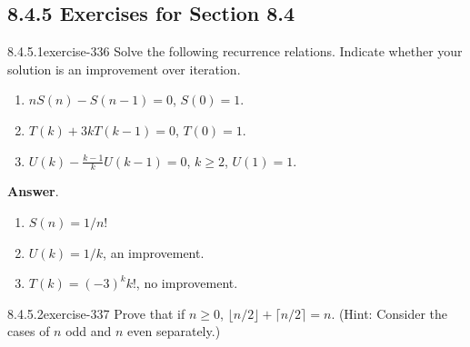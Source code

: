 \documentclass[twoside,10pt,]{book}
\numberwithin{equation}{section}
\begin{document}
\subsection*{8.4.5 Exercises for Section 8.4}
\begin{divisionsolution}{8.4.5.1}{}{exercise-336}%
\hypertarget{p-2800}{}%
Solve the following recurrence relations. Indicate whether your solution is an improvement over iteration.%
\par
\hypertarget{p-2801}{}%
\leavevmode%
\begin{enumerate}[label=(\alph*)]
\item\hypertarget{li-1368}{}\hypertarget{p-2802}{}%
\(n S(n) - S(n - 1) = 0\), \(S(0) = 1\).%
\item\hypertarget{li-1369}{}\hypertarget{p-2803}{}%
\(T(k) + 3k T(k - 1) = 0\), \(T(0) = 1\).%
\item\hypertarget{li-1370}{}\hypertarget{p-2804}{}%
\(U(k) -\frac{k-1}{k}U(k - 1) = 0\), \(k \geq  2\), \(U(1) = 1\).%
\end{enumerate}
%
\par\smallskip%
\noindent\textbf{Answer}.\quad%
\hypertarget{p-2805}{}%
\leavevmode%
\begin{enumerate}[label=(\alph*)]
\item\hypertarget{li-1371}{}\hypertarget{p-2806}{}%
\(S(n)=1/n\)!%
\item\hypertarget{li-1372}{}\hypertarget{p-2807}{}%
\(U(k)=1/k\), an improvement.%
\item\hypertarget{li-1373}{}\hypertarget{p-2808}{}%
\(T(k)=(-3)^kk\)!, no improvement.%
\end{enumerate}
%
\end{divisionsolution}%
\begin{divisionsolution}{8.4.5.2}{}{exercise-337}%
\hypertarget{p-2809}{}%
Prove that if \(n \geq 0\), \(\lfloor n/2\rfloor +\lceil n/2\rceil = n\). (Hint: Consider the cases of \(n\) odd and \(n\) even separately.)%
\end{divisionsolution}%
\end{document}
